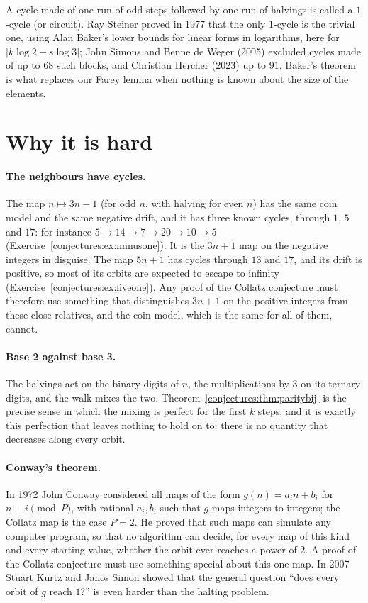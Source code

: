 \begin{remark}\label{conjectures:rem:mcycles}
A cycle made of one run of odd steps followed by one run of halvings is called a $1$-cycle (or circuit). Ray Steiner proved in 1977 that the only
$1$-cycle is the trivial one, using Alan Baker's lower bounds for linear forms in logarithms, here for $|k\log2-s\log3|$; John Simons and Benne de
Weger (2005) excluded cycles made of up to $68$ such blocks, and Christian Hercher (2023) up to $91$. Baker's theorem is what replaces our Farey lemma
when nothing is known about the size of the elements.
\end{remark}

\section{Why it is hard}

\paragraph{The neighbours have cycles.} The map $n\mapsto3n-1$ (for odd $n$, with halving for even $n$) has the same coin model and the same negative
drift, and it has three known cycles, through $1$, $5$ and $17$: for instance $5\to14\to7\to20\to10\to5$ (Exercise~\ref{conjectures:ex:minusone}). It is the
$3n+1$ map on the negative integers in disguise. The map $5n+1$ has cycles through $13$ and $17$, and its drift is positive, so most of its orbits are
expected to escape to infinity (Exercise~\ref{conjectures:ex:fiveone}). Any proof of the Collatz conjecture must therefore use something that distinguishes $3n+1$
on the positive integers from these close relatives, and the coin model, which is the same for all of them, cannot.

\paragraph{Base 2 against base 3.} The halvings act on the binary digits of $n$, the multiplications by $3$ on its ternary digits, and the walk mixes
the two. Theorem~\ref{conjectures:thm:paritybij} is the precise sense in which the mixing is perfect for the first $k$ steps, and it is exactly this perfection that
leaves nothing to hold on to: there is no quantity that decreases along every orbit.

\paragraph{Conway's theorem.} In 1972 John Conway considered all maps of the form $g(n)=a_in+b_i$ for $n\equiv i\pmod P$, with rational $a_i,b_i$ such that
$g$ maps integers to integers; the Collatz map is the case $P=2$. He proved that such maps can simulate any computer program, so that no algorithm can
decide, for every map of this kind and every starting value, whether the orbit ever reaches a power of $2$. A proof of the Collatz conjecture must use
something special about this one map. In 2007 Stuart Kurtz and Janos Simon showed that the general question ``does every orbit of $g$ reach $1$?'' is
even harder than the halting problem.


